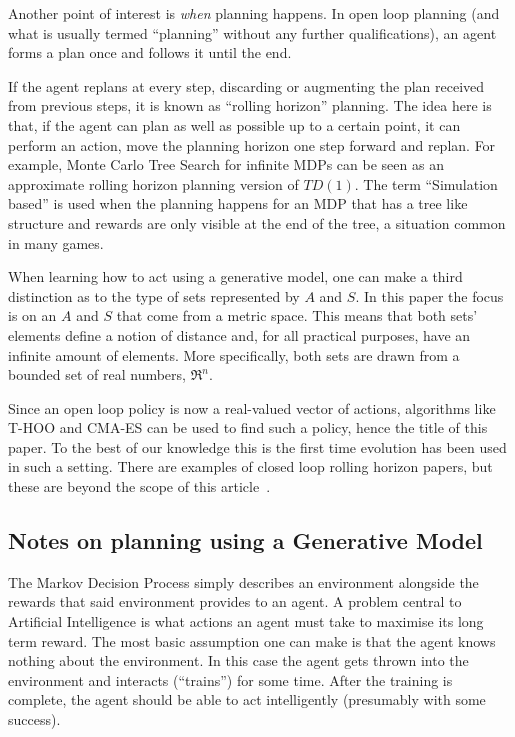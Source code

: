 \documentclass[conference]{IEEEtran}
\begin{document}
Another point of interest is \textit{when} planning happens. In open loop planning (and what is usually termed ``planning'' without any further qualifications), an agent forms a plan once and follows it until the end.

If the agent replans at every step, discarding or augmenting the plan received from previous steps, it is known as ``rolling horizon'' planning. The idea here is that, if the agent can plan as well as possible up to a  certain point, it can perform an action, move the planning horizon one step forward and replan. For example, Monte Carlo Tree Search for infinite MDPs can be seen as an approximate rolling horizon planning version of $TD(1)$\cite{silver2009reinforcement}.  The term ``Simulation based'' is used when the planning happens for an MDP that has a tree like structure and rewards are only visible at the end of the tree, a situation common in many games.

When learning how to act using a generative model, one can make a third distinction as to the type of sets represented by $A$ and $S$. In this paper the focus is on an $A$ and $S$ that come from a metric space. This means  that both sets' elements define a notion of distance and, for all practical purposes, have an infinite amount of elements. More specifically, both sets are drawn from a bounded set of real numbers, $\Re^n$.

Since an open loop policy is now a real-valued vector of actions, algorithms like T-HOO and CMA-ES can be used to find such a policy, hence the title of this paper. To the best of our knowledge this is the first time evolution has been used in such a setting. There are examples of closed loop rolling horizon papers, but these are beyond the scope of this article~\cite{xiang2012differential,samothrakis2010planning}.



\subsection{Notes on planning using a Generative Model}

The Markov Decision Process simply describes an environment alongside the rewards that said environment provides to an agent. A problem central to Artificial Intelligence is what actions an agent must take to maximise its long term reward. The most basic assumption one can make is that the agent knows nothing about the environment. In this case the agent gets thrown into the environment and interacts (``trains'') for some time. After the training is complete, the agent should be able to act intelligently (presumably with some success).
\end{document}
